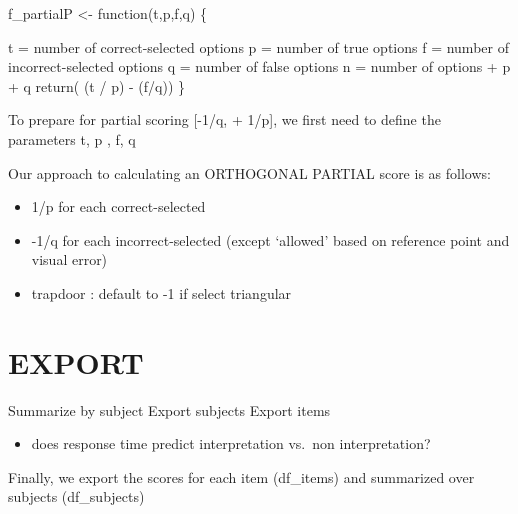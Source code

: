 \documentclass[
  letterpaper,
  DIV=11,
  numbers=noendperiod]{scrreprt}
\providecommand{\tightlist}{%
  \setlength{\itemsep}{0pt}\setlength{\parskip}{0pt}}\usepackage{longtable,booktabs,array}
\begin{document}
f\_partialP \textless- function(t,p,f,q) \{

t = number of correct-selected options p = number of true options f =
number of incorrect-selected options q = number of false options n =
number of options + p + q return( (t / p) - (f/q)) \}

To prepare for partial scoring {[}-1/q, + 1/p{]}, we first need to
define the parameters t, p , f, q

Our approach to calculating an ORTHOGONAL PARTIAL score is as follows:

\begin{itemize}
\item
  1/p for each correct-selected
\item
  -1/q for each incorrect-selected (except `allowed' based on reference
  point and visual error)
\item
  trapdoor : default to -1 if select triangular
\end{itemize}

\hypertarget{export-1}{%
\section{EXPORT}\label{export-1}}

Summarize by subject Export subjects Export items

\begin{itemize}
\tightlist
\item
  does response time predict interpretation vs.~non interpretation?
\end{itemize}

Finally, we export the scores for each item (df\_items) and summarized
over subjects (df\_subjects)
\end{document}
